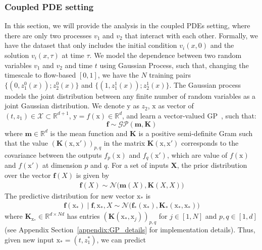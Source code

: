 \documentclass{article}
\begin{document}
\subsubsection{Coupled PDE setting}
\label{sec:Gaussian_coupled}
In this section, we will provide the analysis in the coupled PDEs setting, where there are only two processes $v_1$ and $v_2$ that interact with each other. Formally, we have the dataset that only includes the initial condition $v_i(x,0)$ and the solution $v_i(x, \tau)$ at time $\tau$. We model the dependence between two random variables $v_1$ and $v_2$ and time $t$ using Gaussian Process, such that, changing the timescale to flow-based $[0, 1]$, we have the $N$ training pairs $\{(0, z^0_1(x)); z^0_2(x)\}$ and $\{(1, z^1_1(x)); z^1_2(x)\}$. The Gaussian process \citep{Rasmussen2006Gaussian} models the joint distribution between any finite number of random variables as a joint Gaussian distribution. We denote $\mathrm{y}$ as $z_2$, $\mathrm{x}$ as vector of  $(t, z_1) \in \mathcal{X} \subset \mathbb{R}^{d+1}$, $\mathrm{y} = f(\mathrm{x}) \in \mathbb{R}^d$, and learn a vector-valued GP~\citep{alvarez2012kernelsvectorvaluedfunctionsreview}, such that:
\begin{equation}
   \mathbf{f} \sim \mathcal{GP}(\mathbf{m}, \mathbf{K})
\end{equation}
where $\mathbf{m} \in \mathbb{R}^d$ is the mean function and $\mathbf{K}$ is a
positive semi-definite Gram 
such that the value $(\mathbf{K}(\mathrm{x},\mathrm{x}'))_{p,q}$ in the matrix $\mathbf{K}(\mathrm{x}, \mathrm{x}')$ corresponds to
the covariance between the outputs $f_p(\mathrm{x})$ and $f_q(\mathrm{x}')$, which are value of $f(\mathrm{x})$ and $f(\mathrm{x}')$ at dimension $p$ and $q$. For a set of inputs $\mathbf{X}$, the prior distribution over the vector $\mathbf{f}(X)$ is given by 
\begin{align}
    \mathbf{f}(X) \sim \mathcal{N}\big(\mathbf{m}(X), \mathbf{K}(X,X) \big)
\end{align}
The predictive distribution for new vector $\mathrm{x}_{*}$ is 
\begin{align}
    \mathbf{f}(\mathrm{x}_{*}) \mid \mathbf{f}, \mathrm{x}_{*}, X \sim \mathcal{N} \big(\mathbf{f}_{*}(\mathrm{x}_{*}) , \mathbf{K}_{*}(\mathrm{x}_{*}, \mathrm{x}_{*})\big)
\end{align}
where $\mathbf{K}_{\mathrm{x}_*} \in \mathbb{R}^{d \times Nd}$ has entries $(\mathbf{K}(\mathrm{x}_{*}, \mathrm{x}_{j}))_{p,q}$ for $j \in [1,N]$ and $p,q \in [1, d]$ (see Appendix Section~\ref{appendix:GP_details} for implementation details). Thus, given new input $\mathrm{x}_{*} = (t, z_1^*)$, we can predict 
\end{document}
